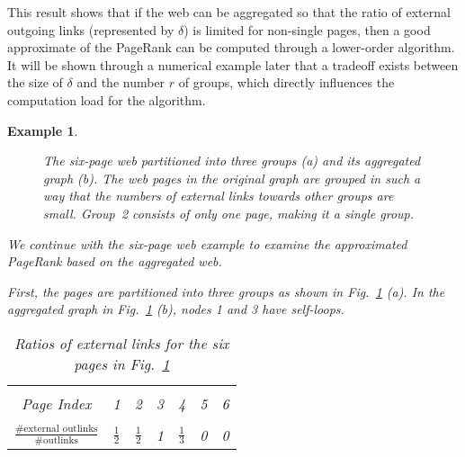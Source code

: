 \documentclass[11pt,draftcls,onecolumn]{IEEEtran}
\newtheorem{example}[theorem]{Example}
\begin{document}
This result \cite{IshTemBai:12} shows that if the web can be aggregated so that 
the ratio of external outgoing links (represented by $\delta$) 
is limited for non-single pages,
then a good approximate of the PageRank can be computed
through a lower-order algorithm. It will be shown through
a numerical example later that a tradeoff exists between
the size of $\delta$ and the number $r$ of groups, which
directly influences the computation load for the algorithm. 
















\begin{example}
\rm
\label{ex:orig}

\begin{figure}
  \centering
  \caption{The six-page web partitioned into three groups (a) and its aggregated graph (b).
       The web pages in the original graph are grouped in such a way that the numbers of 
       external links towards other groups are small. Group~2 consists of only one page, making
       it a single group.}           
  \label{fig:agg}  
\end{figure}

We continue with the six-page web example to examine the approximated
PageRank based on the aggregated web. 

First, the pages are partitioned into three groups as shown in Fig.~\ref{fig:agg} (a).
In the aggregated graph in Fig.~\ref{fig:agg} (b), 
nodes 1 and 3 have self-loops.

\begin{table}[t]
\begin{center}
\caption{Ratios of external links for the six pages in Fig.~\ref{fig:agg}}
\label{table:nodepara}
\begin{tabular}{ccccccc}
  \hline\\[-4mm]
    Page Index & 1 & 2 & 3 & 4 & 5 & 6\\[1mm]
  \hline\\[-4mm]  
   {\large $\frac{\text{\# external outlinks}}{\text{\# outlinks}}$}
      & $\frac{1}{2}$ & $\frac{1}{2}$ & 1 & $\frac{1}{3}$ & 0 & 0\\[1mm]
  \hline
\end{tabular}
\end{center}
\end{table}


\end{example}
\end{document}
